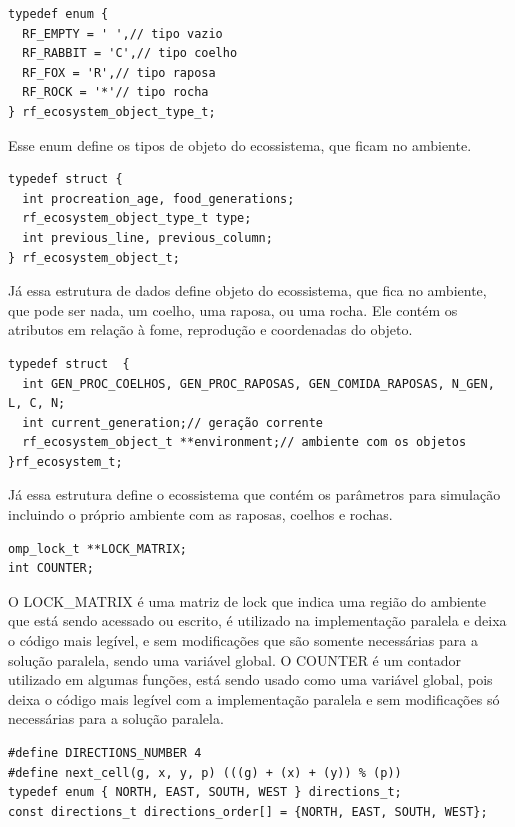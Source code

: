 \documentclass[12pt]{article}
\begin{document}
\begin{verbatim}
typedef enum {
  RF_EMPTY = ' ',// tipo vazio
  RF_RABBIT = 'C',// tipo coelho
  RF_FOX = 'R',// tipo raposa
  RF_ROCK = '*'// tipo rocha
} rf_ecosystem_object_type_t;
      \end{verbatim}

Esse enum define os tipos de objeto do ecossistema, que ficam no ambiente.

\begin{verbatim}
typedef struct {
  int procreation_age, food_generations;
  rf_ecosystem_object_type_t type;
  int previous_line, previous_column;
} rf_ecosystem_object_t;
      \end{verbatim}

Já essa estrutura de dados define objeto do ecossistema, que fica no ambiente, que pode ser nada, um coelho, uma raposa, ou uma rocha. Ele contém os atributos em relação à fome, reprodução e coordenadas do objeto.

\begin{verbatim}
typedef struct  {
  int GEN_PROC_COELHOS, GEN_PROC_RAPOSAS, GEN_COMIDA_RAPOSAS, N_GEN, L, C, N;
  int current_generation;// geração corrente
  rf_ecosystem_object_t **environment;// ambiente com os objetos
}rf_ecosystem_t;
      \end{verbatim}


Já essa estrutura define o ecossistema que contém os parâmetros para simulação incluindo o próprio ambiente com as raposas, coelhos e rochas.

\begin{verbatim}
omp_lock_t **LOCK_MATRIX;
int COUNTER;
      \end{verbatim}

O LOCK\_MATRIX é uma matriz de lock que indica uma região do ambiente que está sendo acessado ou escrito, é utilizado na implementação paralela e deixa o código mais legível, e sem modificações que são somente necessárias para a solução paralela, sendo uma variável global.
O COUNTER é um contador utilizado em algumas funções, está sendo usado como uma variável global, pois deixa o código mais legível com a implementação paralela e sem modificações só necessárias para a solução paralela.


\begin{verbatim}
#define DIRECTIONS_NUMBER 4
#define next_cell(g, x, y, p) (((g) + (x) + (y)) % (p))
typedef enum { NORTH, EAST, SOUTH, WEST } directions_t;
const directions_t directions_order[] = {NORTH, EAST, SOUTH, WEST};
      \end{verbatim}
\end{document}
